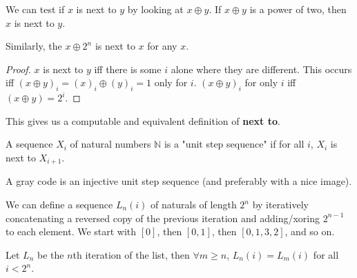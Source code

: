 \begin{theorem}
    \label{thm:next_to_xor_two_pow}
    \leanok
    We can test if $x$ is next to $y$ by looking at $x \oplus y$. If $x \oplus y$ is a
    power of two, then $x$ is next to $y$.

    Similarly, the $x \oplus 2^n$ is next to $x$ for any $x$.
\end{theorem}

\begin{proof}
    \leanok
    $x$ is next to $y$ iff there is some $i$ alone where they are different.
    This occurs iff $(x \oplus y)_i = (x)_i \oplus (y)_i = 1$ only for $i$.
    $(x \oplus y)_i$ for only $i$ iff $(x \oplus y) = 2^i$.
\end{proof}

\begin{definition}
    \label{def:computable_next_to}
    \leanok

    This gives us a computable and equivalent definition of \textbf{next to}.
\end{definition}

\begin{definition}
    \label{def:unit_step_sequence}
    \leanok
    A sequence $X_i$ of natural numbers $\mathbb{N}$ is a "unit step sequence" if
    for all $i$, $X_i$ is next to $X_{i+1}$.
\end{definition}

\begin{definition}
    \label{def:gray_code}
    \leanok

    A gray code is an injective unit step sequence (and preferably with a nice image).
\end{definition}

\begin{definition}
    \label{def:list_gray_code}
    \leanok

    We can define a sequence $L_n(i)$ of naturals of length $2^n$ by iteratively concatenating
    a reversed copy of the previous iteration and adding/xoring $2^{n-1}$ to each element.
    We start with $[0]$, then $[0, 1]$, then $[0, 1, 3, 2]$, and so on.
\end{definition}

\begin{theorem}
    \label{thm:list_is_stable}
    \leanok

    Let $L_n$ be the $n$th iteration of the list, then $\forall m \ge n$, $L_n(i) = L_m(i)$ for all $i < 2^n$.
\end{theorem}

